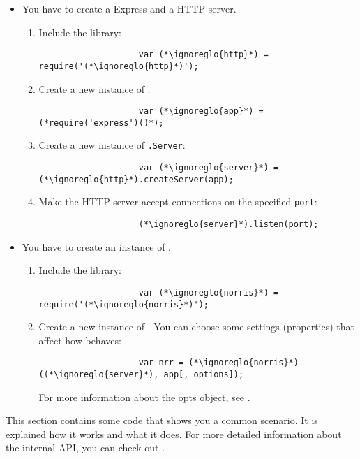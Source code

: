 		\begin{itemize}
			\item You have to create a Express and a HTTP server.
			\begin{enumerate}
				\item Include the library:
				\begin{lstlisting}
					var (*\ignoreglo{http}*) = require('(*\ignoreglo{http}*)');
				\end{lstlisting}
				\item Create a new instance of \texttt{}:
				\begin{lstlisting}
					var (*\ignoreglo{app}*) = (*require('express')()*);
				\end{lstlisting}
				\item Create a new instance of \texttt{.Server}:
				\begin{lstlisting}
					var (*\ignoreglo{server}*) = (*\ignoreglo{http}*).createServer(app);
				\end{lstlisting}
				\item Make the HTTP server accept connections on the specified \texttt{port}:
				\begin{lstlisting}
					(*\ignoreglo{server}*).listen(port);
				\end{lstlisting}
			\end{enumerate}
			\item You have to create an instance of .
			\begin{enumerate}
				\item Include the library:
				\begin{lstlisting}
					var (*\ignoreglo{norris}*) = require('(*\ignoreglo{norris}*)');
				\end{lstlisting}
				\item Create a new instance of . You can choose some settings (properties) that affect how  behaves:
				\begin{lstlisting}
					var nrr = (*\ignoreglo{norris}*)((*\ignoreglo{server}*), app[, options]);
				\end{lstlisting}
				For more information about the opts object, see .
			\end{enumerate}
		\end{itemize}
		This section contains some code that shows you a common scenario. It is explained how it works and what it does. For more detailed information about the internal API, you can check out .\\
